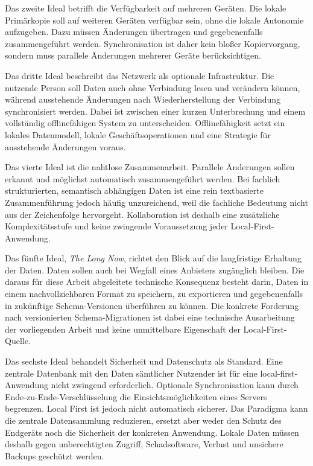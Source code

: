 Das zweite Ideal betrifft die Verfügbarkeit auf mehreren Geräten.
Die lokale Primärkopie soll auf weiteren Geräten verfügbar sein, ohne die lokale Autonomie aufzugeben.
Dazu müssen Änderungen übertragen und gegebenenfalls zusammengeführt werden.
Synchronisation ist daher kein bloßer Kopiervorgang, sondern muss parallele Änderungen mehrerer Geräte berücksichtigen.

Das dritte Ideal beschreibt das Netzwerk als optionale Infrastruktur.
Die nutzende Person soll Daten auch ohne Verbindung lesen und verändern können, während ausstehende Änderungen nach Wiederherstellung der Verbindung synchronisiert werden.
Dabei ist zwischen einer kurzen Unterbrechung und einem vollständig offlinefähigen System zu unterscheiden.
Offlinefähigkeit setzt ein lokales Datenmodell, lokale Geschäftsoperationen und eine Strategie für ausstehende Änderungen voraus.

Das vierte Ideal ist die nahtlose Zusammenarbeit.
Parallele Änderungen sollen erkannt und möglichst automatisch zusammengeführt werden.
Bei fachlich strukturierten, semantisch abhängigen Daten ist eine rein textbasierte Zusammenführung jedoch häufig unzureichend, weil die fachliche Bedeutung nicht aus der Zeichenfolge hervorgeht.
Kollaboration ist deshalb eine zusätzliche Komplexitätsstufe und keine zwingende Voraussetzung jeder Local-First-Anwendung.

Das fünfte Ideal, \emph{The Long Now}, richtet den Blick auf die langfristige Erhaltung der Daten.
Daten sollen auch bei Wegfall eines Anbieters zugänglich bleiben.
Die daraus für diese Arbeit abgeleitete technische Konsequenz besteht darin, Daten in einem nachvollziehbaren Format zu speichern, zu exportieren und gegebenenfalls in zukünftige Schema-Versionen überführen zu können.
Die konkrete Forderung nach versionierten Schema-Migrationen ist dabei eine technische Ausarbeitung der vorliegenden Arbeit und keine unmittelbare Eigenschaft der Local-First-Quelle.

Das sechste Ideal behandelt Sicherheit und Datenschutz als Standard.
Eine zentrale Datenbank mit den Daten sämtlicher Nutzender ist für eine local-first-Anwendung nicht zwingend erforderlich.
Optionale Synchronisation kann durch Ende-zu-Ende-Verschlüsselung die Einsichtsmöglichkeiten eines Servers begrenzen.
Local First ist jedoch nicht automatisch sicherer.
Das Paradigma kann die zentrale Datensammlung reduzieren, ersetzt aber weder den Schutz des Endgeräts noch die Sicherheit der konkreten Anwendung.
Lokale Daten müssen deshalb gegen unberechtigten Zugriff, Schadsoftware, Verlust und unsichere Backups geschützt werden.


